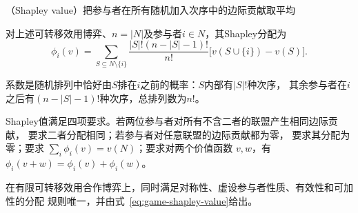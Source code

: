 （Shapley value）把参与者在所有随机加入次序中的边际贡献取平均
\begin{definition}[Shapley值]
\label{def:game-shapley-value}
对上述可转移效用博弈、\(n=|N|\)及参与者$i\in N$，其Shapley分配为
\begin{equation}
  \phi_i(v)
  =
  \sum_{S\subseteq N\setminus\{i\}}
  \frac{|S|!(n-|S|-1)!}{n!}
  \bigl[
    v(S\cup\{i\})-v(S)
  \bigr].
  \label{eq:game-shapley-value}
\end{equation}
\end{definition}
系数是随机排列中恰好由\(S\)排在\(i\)之前的概率：\(S\)内部有\(|S|!\)种次序，
其余参与者在\(i\)之后有\((n-|S|-1)!\)种次序，总排列数为\(n!\)。

Shapley值满足四项要求。若两位参与者对所有不含二者的联盟产生相同边际贡献，
要求二者分配相同；若参与者对任意联盟的边际贡献都为零，
要求其分配为零；要求
\(\sum_i\phi_i(v)=v(N)\)；要求对两个价值函数
\(v,w\)，有\(\phi_i(v+w)=\phi_i(v)+\phi_i(w)\)。

\begin{theorem}[Shapley值的公理刻画]
\label{thm:game-shapley-characterization}
在有限可转移效用合作博弈上，同时满足对称性、虚设参与者性质、有效性和可加性的分配
规则唯一，并由式~\eqref{eq:game-shapley-value}给出。
\end{theorem}

